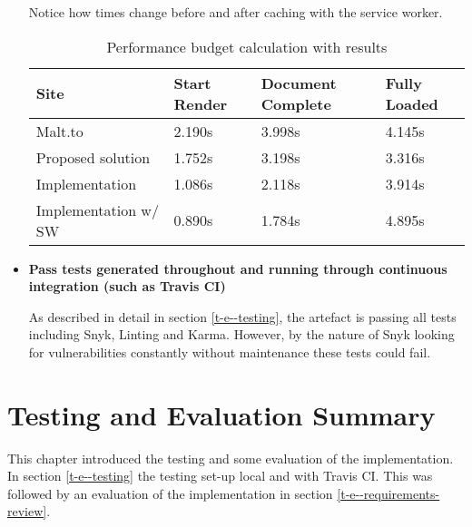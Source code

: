 \begin{itemize}
    Notice how times change before and after caching with the service worker.

    \begin{table}[H]
    \centering
    \begin{tabular}{|l|l|l|l|}
    \hline
    \textbf{Site}        & \textbf{Start Render} & \textbf{Document Complete} & \textbf{Fully Loaded} \\ \hline
    Malt.to              & 2.190s                & 3.998s                     & 4.145s                \\ \hline
    Proposed solution    & 1.752s                & 3.198s                     & 3.316s                \\ \hline
    Implementation       & 1.086s                & 2.118s                     & 3.914s                \\ \hline
    Implementation w/ SW & 0.890s                & 1.784s	                    & 4.895s	              \\ \hline
    \end{tabular}
    \caption{Performance budget calculation with results}
    \label{table-performance-budget-results}
    \end{table}

  \item \textbf{Pass tests generated throughout and running through continuous integration (such as Travis CI)}

    As described in detail in section \ref{t-e--testing}, the artefact is passing all tests including Snyk, Linting and Karma. However, by the nature of Snyk looking for vulnerabilities constantly without maintenance these tests could fail.

\end{itemize}

\section{Testing and Evaluation Summary} \label{t-e--testing-and-evaluation-summary}

This chapter introduced the testing and some evaluation of the implementation. In section \ref{t-e--testing} the testing set-up local and with Travis CI. This was followed by an evaluation of the implementation in section \ref{t-e--requirements-review}.
